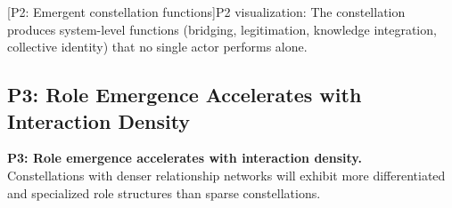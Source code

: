 \documentclass[../main.tex]{subfiles}
\begin{document}
\begin{center}
[P2: Emergent constellation functions]{P2 visualization: The constellation produces system-level functions (bridging, legitimation, knowledge integration, collective identity) that no single actor performs alone.}
\end{center}

\vspace{0.5cm}
\subsection{P3: Role Emergence Accelerates with Interaction Density}

\begin{propositionbox}
\textbf{P3: Role emergence accelerates with interaction density.}\\[3pt]
Constellations with denser relationship networks will exhibit more differentiated and specialized role structures than sparse constellations.
\end{propositionbox}
\end{document}
